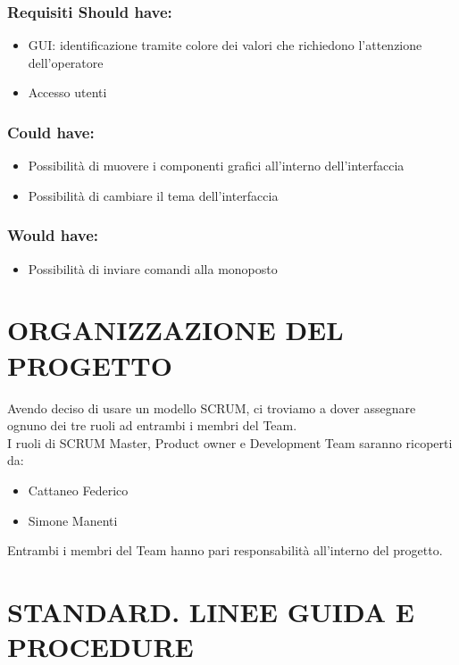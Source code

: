 \documentclass{report}
\begin{document}
\subsection*{Requisiti Should have:}
\begin{itemize}
\item GUI: identificazione tramite colore dei valori che richiedono l'attenzione dell'operatore
\item Accesso utenti
\end{itemize}

\subsection*{Could have:}
\begin{itemize}
\item Possibilità di muovere i componenti grafici all'interno dell'interfaccia
\item Possibilità di cambiare il tema dell'interfaccia
\end{itemize}

\subsection*{Would have:}
\begin{itemize}
\item Possibilità di inviare comandi alla monoposto
\end{itemize}


\chapter{ORGANIZZAZIONE DEL PROGETTO}
Avendo deciso di usare un modello SCRUM, ci troviamo a dover assegnare ognuno dei tre ruoli ad entrambi i membri del Team.\\
I ruoli di SCRUM Master, Product owner e Development Team saranno ricoperti da:
\begin{itemize}
\item Cattaneo Federico
\item Simone Manenti
\end{itemize}
Entrambi i membri del Team hanno pari responsabilità all'interno del progetto.

\begingroup
\let\clearpage\relax
\chapter{STANDARD. LINEE GUIDA E PROCEDURE}
\endgroup
\end{document}
